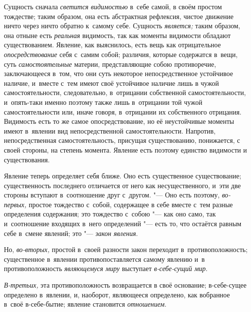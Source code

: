 Сущность сначала {\em светится видимостью} в~себе самой,
в своём простом тождестве; таким образом, она есть абстрактная рефлексия,
чистое движение ничто через ничто обратно к~самому себе. Сущность
{\em является;} таким образом, она отныне есть
{\em реальная} видимость, так как моменты видимости
обладают существованием. Явление, как выяснилось, есть вещь как
отрицательное {\em опосредствование} себя с~самим
собой; различия, которые содержатся в~вещи, суть
{\em самостоятельные} материи, представляющие собою
противоречие, заключающееся в~том, что они суть некоторое непосредственное
устойчивое наличие, и~вместе с~тем имеют своё устойчивое наличие лишь в
чужой самостоятельности, следовательно, в~отрицании собственной
самостоятельности, и~опять-таки именно поэтому также лишь в~отрицании той
чужой самостоятельности или, иначе говоря, в~отрицании их собственного
отрицания. Видимость есть то же самое опосредствование, но её неустойчивые
моменты имеют в~явлении вид непосредственной самостоятельности. Напротив,
непосредственная самостоятельность, присущая существованию, понижается, с
своей стороны, на степень момента. Явление есть поэтому единство видимости
и существования.

Явление теперь определяет себя ближе. Оно есть существенное существование;
существенность последнего отличается от него как несущественного, и~эти две
стороны вступают в~соотношение друг с~другом. "--- Оно есть поэтому,
{\em во-первых,} простое тождество с~собой, содержащее
в себе вместе с~тем разные определения содержания; это тождество с~собою
"--- как оно само, так и~соотношение входящих в~него определений "--- есть то,
что остаётся равным себе в~смене явлений; это
"--- {\em закон явления}.

Но, {\em во-вторых,} простой в~своей разности закон
переходит в~противоположность; существенное в~явлении противопоставляется
самому явлению и~в противоположность {\em являющемуся
миру} выступает {\em в-себе-сущий мир}.

{\em В-третьих,} эта противоположность возвращается в
своё основание; в-себе-сущее определено в~явлении, и, наоборот, являющееся
определено, как вобранное в~своё в-себе-бытие; явление становится
{\em отношением}.

